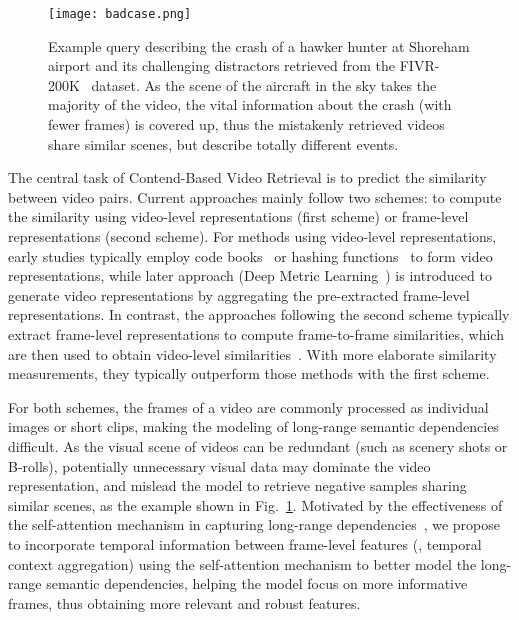 \documentclass[10pt,twocolumn,letterpaper]{article}
\begin{document}
\begin{figure}[t]
    \centering
    \texttt{[image: badcase.png]}
    \caption{Example query describing the crash of a hawker hunter at Shoreham airport and its challenging distractors retrieved from the FIVR-200K~\cite{kordopatis2019fivr} dataset. As the scene of the aircraft in the sky takes the majority of the video, the vital information about the crash (with fewer frames) is covered up, thus the mistakenly retrieved videos share similar scenes, but describe totally different events.}
    \label{fig:badcase}
\end{figure}

The central task of Contend-Based Video Retrieval is to predict the similarity between video pairs. Current approaches mainly follow two schemes: to compute the similarity using video-level representations (first scheme) or frame-level representations (second scheme).
For methods using video-level representations, early studies typically employ code books~\cite{cai2011million,kordopatis2017near,liao2018ir} or hashing functions~\cite{song2011multiple,song2013effective} to form video representations, while later approach (Deep Metric Learning~\cite{kordopatis2017dml}) is introduced to generate video representations by aggregating the pre-extracted frame-level representations. In contrast, the approaches following the second scheme typically extract frame-level representations to compute frame-to-frame similarities, which are then used to obtain video-level similarities~\cite{chou2015pattern,Liu2017An,kordopatis2019visil,tan2009scalable}. 
With more elaborate similarity measurements, they typically outperform those methods with the first scheme.

For both schemes, the frames of a video are commonly processed as individual images or short clips, making the modeling of long-range semantic dependencies difficult. As the visual scene of videos can be redundant (such as scenery shots or B-rolls), potentially unnecessary visual data may dominate the video representation, and mislead the model to retrieve negative samples sharing similar scenes, as the example shown in Fig.~\ref{fig:badcase}. 
Motivated by the effectiveness of the self-attention mechanism in capturing long-range dependencies~\cite{vaswani2017attention}, we propose to incorporate temporal information between frame-level features (\ie, temporal context aggregation) using the self-attention mechanism to better model the long-range semantic dependencies, helping the model focus on more informative frames, thus obtaining more relevant and robust features.
\end{document}

